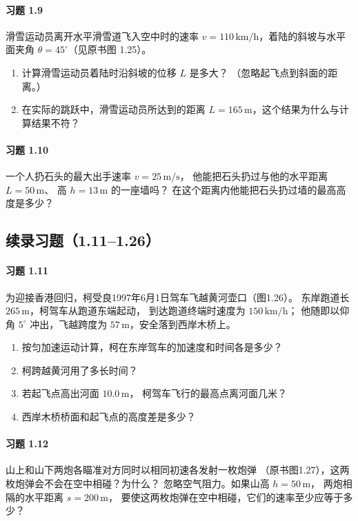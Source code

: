 \paragraph{习题 1.9}
滑雪运动员离开水平滑雪道飞入空中时的速率
\(v=110\,\mathrm{km/h}\)，着陆的斜坡与水平面夹角
\(\theta=45^\circ\)（见原书图 1.25）。
\begin{enumerate}
\item 计算滑雪运动员着陆时沿斜坡的位移 \(L\) 是多大？
（忽略起飞点到斜面的距离。）
\item 在实际的跳跃中，滑雪运动员所达到的距离
\(L=165\,\mathrm{m}\)，这个结果为什么与计算结果不符？
\end{enumerate}

\paragraph{习题 1.10}
一个人扔石头的最大出手速率 \(v=25\,\mathrm{m/s}\)，
他能把石头扔过与他的水平距离 \(L=50\,\mathrm{m}\)、
高 \(h=13\,\mathrm{m}\) 的一座墙吗？
在这个距离内他能把石头扔过墙的最高高度是多少？


\subsection*{续录习题（1.11--1.26）}

\paragraph{习题 1.11}
为迎接香港回归，柯受良1997年6月1日驾车飞越黄河壶口（图1.26）。
东岸跑道长 \(265\,\mathrm{m}\)，柯驾车从跑道东端起动，
到达跑道终端时速度为 \(150\,\mathrm{km/h}\)；
他随即以仰角 \(5^\circ\) 冲出，飞越跨度为
\(57\,\mathrm{m}\)，安全落到西岸木桥上。
\begin{enumerate}
\item 按匀加速运动计算，柯在东岸驾车的加速度和时间各是多少？
\item 柯跨越黄河用了多长时间？
\item 若起飞点高出河面 \(10.0\,\mathrm{m}\)，
柯驾车飞行的最高点离河面几米？
\item 西岸木桥桥面和起飞点的高度差是多少？
\end{enumerate}

\paragraph{习题 1.12}
山上和山下两炮各瞄准对方同时以相同初速各发射一枚炮弹
（原书图1.27），这两枚炮弹会不会在空中相碰？为什么？
忽略空气阻力。如果山高 \(h=50\,\mathrm{m}\)，
两炮相隔的水平距离 \(s=200\,\mathrm{m}\)，
要使这两枚炮弹在空中相碰，它们的速率至少应等于多少？

